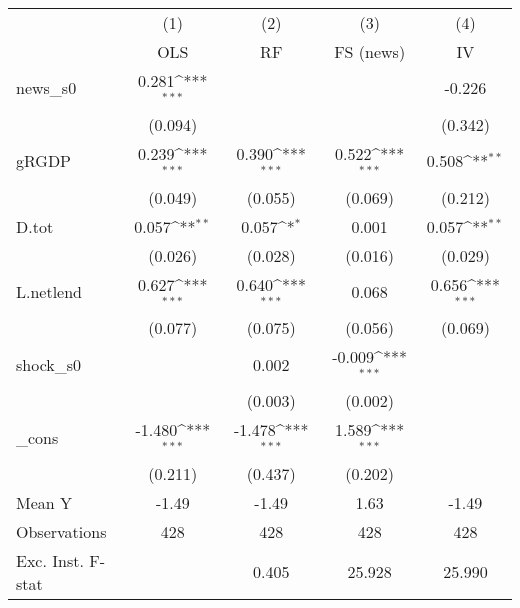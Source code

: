 {
\def\sym#1{\ifmmode^{#1}\else\(^{#1}\)\fi}
\begin{tabular}{l*{4}{c}}
\toprule
            &\multicolumn{1}{c}{(1)}&\multicolumn{1}{c}{(2)}&\multicolumn{1}{c}{(3)}&\multicolumn{1}{c}{(4)}\\
            &\multicolumn{1}{c}{OLS}&\multicolumn{1}{c}{RF}&\multicolumn{1}{c}{FS (news)}&\multicolumn{1}{c}{IV}\\
\midrule
news\_s0     &       0.281\sym{***}&                     &                     &      -0.226         \\
            &     (0.094)         &                     &                     &     (0.342)         \\
\addlinespace
gRGDP       &       0.239\sym{***}&       0.390\sym{***}&       0.522\sym{***}&       0.508\sym{**} \\
            &     (0.049)         &     (0.055)         &     (0.069)         &     (0.212)         \\
\addlinespace
D.tot       &       0.057\sym{**} &       0.057\sym{*}  &       0.001         &       0.057\sym{**} \\
            &     (0.026)         &     (0.028)         &     (0.016)         &     (0.029)         \\
\addlinespace
L.netlend   &       0.627\sym{***}&       0.640\sym{***}&       0.068         &       0.656\sym{***}\\
            &     (0.077)         &     (0.075)         &     (0.056)         &     (0.069)         \\
\addlinespace
shock\_s0    &                     &       0.002         &      -0.009\sym{***}&                     \\
            &                     &     (0.003)         &     (0.002)         &                     \\
\addlinespace
\_cons      &      -1.480\sym{***}&      -1.478\sym{***}&       1.589\sym{***}&                     \\
            &     (0.211)         &     (0.437)         &     (0.202)         &                     \\
\midrule
Mean Y      &       -1.49         &       -1.49         &        1.63         &       -1.49         \\
Observations&         428         &         428         &         428         &         428         \\
Exc. Inst. F-stat&                     &       0.405         &      25.928         &      25.990         \\
\bottomrule
\end{tabular}
}
